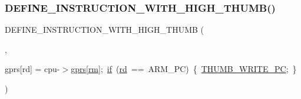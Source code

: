 \subsubsection{\texorpdfstring{D\+E\+F\+I\+N\+E\+\_\+\+I\+N\+S\+T\+R\+U\+C\+T\+I\+O\+N\+\_\+\+W\+I\+T\+H\+\_\+\+H\+I\+G\+H\+\_\+\+T\+H\+U\+M\+B()}{DEFINE\_INSTRUCTION\_WITH\_HIGH\_THUMB()}}
{\footnotesize\ttfamily D\+E\+F\+I\+N\+E\+\_\+\+I\+N\+S\+T\+R\+U\+C\+T\+I\+O\+N\+\_\+\+W\+I\+T\+H\+\_\+\+H\+I\+G\+H\+\_\+\+T\+H\+U\+MB (\begin{DoxyParamCaption}\item[{M\+O\+V3}]{,  }\item[{cpu-\/$>$}]{gprs\mbox{[}rd\mbox{]} = {\ttfamily cpu-\/$>$\mbox{\hyperlink{isa-thumb_8c_a6b4b7e13a9a144391615b217c5917bc7}{gprs}}\mbox{[}\mbox{\hyperlink{isa-thumb_8c_a20e40d2fb8c51fa4dd2b4449ad32e111}{rm}}\mbox{]};~\mbox{\hyperlink{isa-lr35902_8c_a2eb27369cb3dbac14564f95cd51effdf}{if}}~(\mbox{\hyperlink{isa-arm_8c_a555541ce18ed9b5fad657a06b22cb465}{rd}}~==~ARM\+\_\+PC)~\{~\mbox{\hyperlink{isa-thumb_8c_a94ae991d0d338d43766e37c259589656}{T\+H\+U\+M\+B\+\_\+\+W\+R\+I\+T\+E\+\_\+\+PC}};~\}} }\end{DoxyParamCaption})}

\mbox{\label{isa-thumb_8c_ab8cda3a2063c0e7633d6c504961bb608}} 
